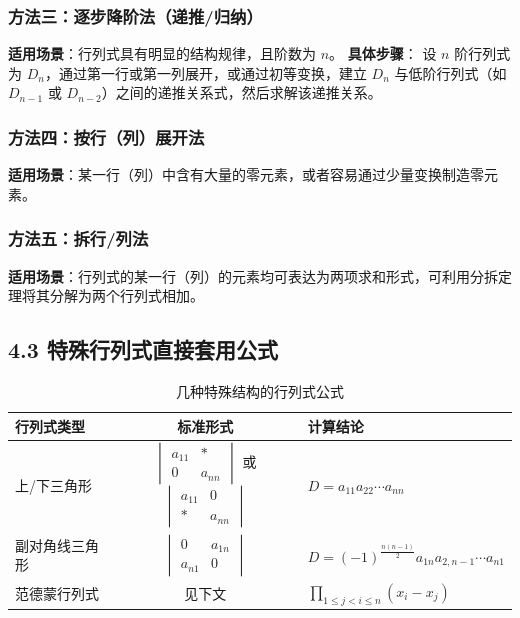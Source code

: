 \documentclass{ctexart}
\begin{document}
\subsubsection{方法三：逐步降阶法（递推/归纳）}
\textbf{适用场景}：行列式具有明显的结构规律，且阶数为 $n$。
\textbf{具体步骤}：
设 $n$ 阶行列式为 $D_n$，通过第一行或第一列展开，或通过初等变换，建立 $D_n$ 与低阶行列式（如 $D_{n-1}$ 或 $D_{n-2}$）之间的递推关系式，然后求解该递推关系。

\subsubsection{方法四：按行（列）展开法}
\textbf{适用场景}：某一行（列）中含有大量的零元素，或者容易通过少量变换制造零元素。

\subsubsection{方法五：拆行/列法}
\textbf{适用场景}：行列式的某一行（列）的元素均可表达为两项求和形式，可利用分拆定理将其分解为两个行列式相加。

\subsection{4.3 特殊行列式直接套用公式}

\begin{table}[htbp]
\centering
\caption{几种特殊结构的行列式公式}
\label{tab:special_det}
\begin{tabular}{lcl}
\toprule
\textbf{行列式类型} & \textbf{标准形式} & \textbf{计算结论} \\
\midrule
上/下三角形 & $\begin{vmatrix} a_{11} & * \\ 0 & a_{nn} \end{vmatrix}$ 或 $\begin{vmatrix} a_{11} & 0 \\ * & a_{nn} \end{vmatrix}$ & $D = a_{11}a_{22}\cdots a_{nn}$ \\
副对角线三角形 & $\begin{vmatrix} 0 & a_{1n} \\ a_{n1} & 0 \end{vmatrix}$ & $D = (-1)^{\frac{n(n-1)}{2}} a_{1n}a_{2,n-1}\cdots a_{n1}$ \\
范德蒙行列式 & 见下文 & $\prod_{1 \le j < i \le n}(x_i - x_j)$ \\
\bottomrule
\end{tabular}
\end{table}
\end{document}

